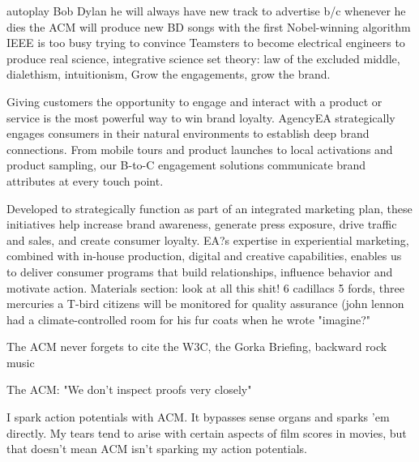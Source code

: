 autoplay Bob Dylan he will always have new track to advertise b/c whenever he dies the ACM will produce new BD songs with the first Nobel-winning algorithm
IEEE is too busy trying to convince Teamsters to become electrical engineers to produce real science, integrative science
set theory: law of the excluded middle, dialethism, intuitionism, Grow the engagements, grow the brand.

Giving customers the opportunity to engage and interact with a product or service is the most powerful way to win brand loyalty. AgencyEA strategically engages consumers in their natural environments to establish deep brand connections. From mobile tours and product launches to local activations and product sampling, our B-to-C engagement solutions communicate brand attributes at every touch point.

Developed to strategically function as part of an integrated marketing plan, these initiatives help increase brand awareness, generate press exposure, drive traffic and sales, and create consumer loyalty. EA?s expertise in experiential marketing, combined with in-house production, digital and creative capabilities, enables us to deliver consumer programs that build relationships, influence behavior and motivate action.
Materials section: look at all this shit! 6 cadillacs 5 fords, three mercuries a T-bird
citizens will be monitored for quality assurance 
(john lennon had a climate-controlled room for his fur coats when he wrote "imagine?"


The ACM never forgets to cite the W3C, the Gorka Briefing, backward rock music

The ACM: "We don't inspect proofs very closely"

I spark action potentials with ACM. It bypasses sense organs and sparks 'em directly. My tears tend to arise with certain aspects of film scores in movies, but that doesn't mean ACM isn't sparking my action potentials. 


